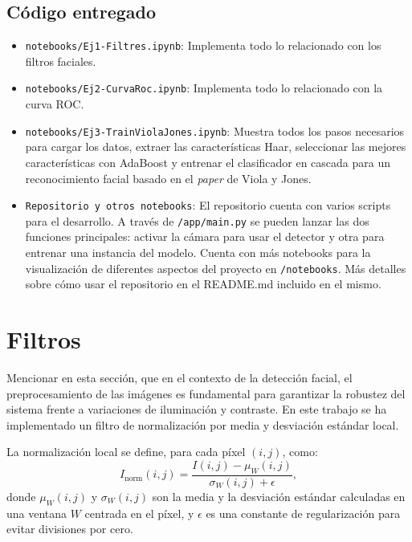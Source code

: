 \documentclass[11pt,spanish,listoffigures,listoftables]{tfgetsinf}
\begin{document}
\section{Código entregado}
\begin{itemize}
  \item \texttt{notebooks/Ej1-Filtres.ipynb}: Implementa todo lo relacionado con los filtros faciales.
  \item \texttt{notebooks/Ej2-CurvaRoc.ipynb}: Implementa todo lo relacionado con la curva ROC.
  \item \texttt{notebooks/Ej3-TrainViolaJones.ipynb}: Muestra todos los pasos necesarios para cargar los datos, extraer las características Haar, seleccionar las mejores características con AdaBoost y entrenar el clasificador en cascada para un reconocimiento facial basado en el \textit{paper} de Viola y Jones. 
  \item \texttt{Repositorio y otros notebooks}: El repositorio cuenta con varios scripts para el desarrollo. A través de \texttt{/app/main.py} se pueden lanzar las dos funciones principales: activar la cámara para usar el detector y otra para entrenar una instancia del modelo. Cuenta con más notebooks para la visualización de diferentes aspectos del proyecto en \texttt{/notebooks}. Más detalles sobre cómo usar el repositorio en el README.md incluido en el mismo. 
\end{itemize}

\chapter{Filtros}

Mencionar en esta sección, que en el contexto de la detección facial, el preprocesamiento de las imágenes es fundamental para garantizar la robustez del sistema frente a variaciones de iluminación y contraste. En este trabajo se ha implementado un filtro de normalización por media y desviación estándar local. 

La normalización local se define, para cada píxel $(i, j)$, como:
\begin{equation}
I_{\text{norm}}(i, j) = \frac{I(i, j) - \mu_W(i, j)}{\sigma_W(i, j) + \epsilon},
\end{equation}
donde $\mu_W(i, j)$ y $\sigma_W(i, j)$ son la media y la desviación estándar calculadas en una ventana $W$ centrada en el píxel, y $\epsilon$ es una constante de regularización para evitar divisiones por cero.
\end{document}

